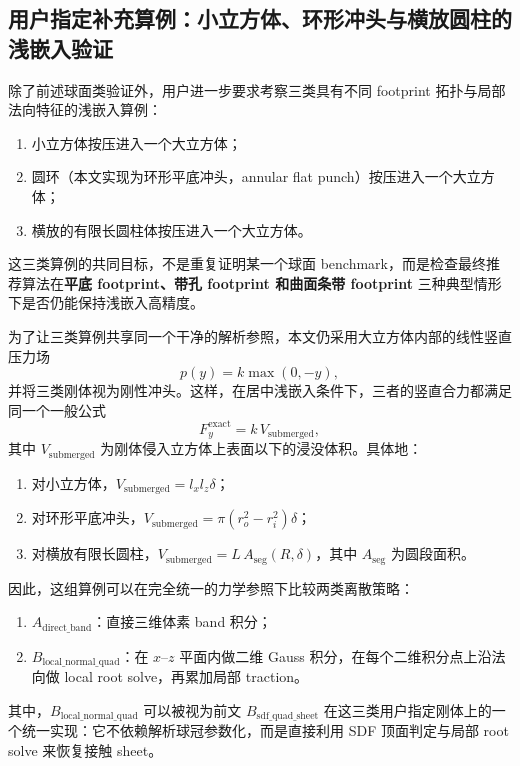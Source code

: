 \documentclass[12pt,a4paper]{ctexart}
\begin{document}
\subsection{用户指定补充算例：小立方体、环形冲头与横放圆柱的浅嵌入验证}

除了前述球面类验证外，用户进一步要求考察三类具有不同 footprint 拓扑与局部法向特征的浅嵌入算例：
\begin{enumerate}
    \item 小立方体按压进入一个大立方体；
    \item 圆环（本文实现为环形平底冲头，annular flat punch）按压进入一个大立方体；
    \item 横放的有限长圆柱体按压进入一个大立方体。
\end{enumerate}
这三类算例的共同目标，不是重复证明某一个球面 benchmark，而是检查最终推荐算法在\textbf{平底 footprint、带孔 footprint 和曲面条带 footprint} 三种典型情形下是否仍能保持浅嵌入高精度。

为了让三类算例共享同一个干净的解析参照，本文仍采用大立方体内部的线性竖直压力场
\begin{equation}
    p(y)=k\max(0,-y),
\end{equation}
并将三类刚体视为刚性冲头。这样，在居中浅嵌入条件下，三者的竖直合力都满足同一个一般公式
\begin{equation}
    F_y^{\mathrm{exact}} = k\,V_{\mathrm{submerged}},
\end{equation}
其中 $V_{\mathrm{submerged}}$ 为刚体侵入立方体上表面以下的浸没体积。具体地：
\begin{enumerate}
    \item 对小立方体，$V_{\mathrm{submerged}}=l_x l_z\delta$；
    \item 对环形平底冲头，$V_{\mathrm{submerged}}=\pi(r_o^2-r_i^2)\delta$；
    \item 对横放有限长圆柱，$V_{\mathrm{submerged}}=L\,A_{\mathrm{seg}}(R,\delta)$，其中 $A_{\mathrm{seg}}$ 为圆段面积。
\end{enumerate}
因此，这组算例可以在完全统一的力学参照下比较两类离散策略：
\begin{enumerate}
    \item $A_{\mathrm{direct\_band}}$：直接三维体素 band 积分；
    \item $B_{\mathrm{local\_normal\_quad}}$：在 $x$--$z$ 平面内做二维 Gauss 积分，在每个二维积分点上沿法向做 local root solve，再累加局部 traction。
\end{enumerate}
其中，$B_{\mathrm{local\_normal\_quad}}$ 可以被视为前文 $B_{\mathrm{sdf\_quad\_sheet}}$ 在这三类用户指定刚体上的一个统一实现：它不依赖解析球冠参数化，而是直接利用 SDF 顶面判定与局部 root solve 来恢复接触 sheet。
\end{document}
